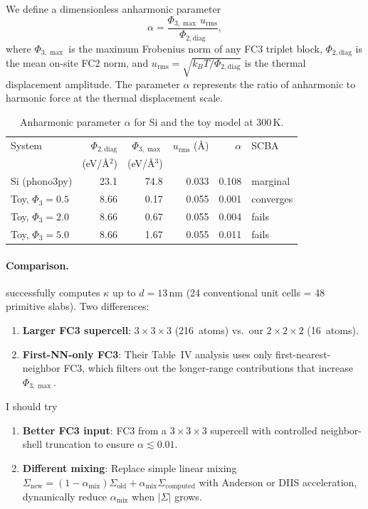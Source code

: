 We define a dimensionless anharmonic parameter
\begin{equation}\label{eq:alpha}
  \alpha = \frac{\Phi_{3,\max}\,u_\mathrm{rms}}{\Phi_{2,\mathrm{diag}}},
\end{equation}
where $\Phi_{3,\max}$ is the maximum Frobenius norm of any FC3 triplet
block, $\Phi_{2,\mathrm{diag}}$ is the mean on-site FC2 norm, and
$u_\mathrm{rms} = \sqrt{k_B T / \Phi_{2,\mathrm{diag}}}$ is the
thermal displacement amplitude.  The parameter $\alpha$ represents the
ratio of anharmonic to harmonic force at the thermal displacement
scale.

\begin{table}[h]
  \centering
  \caption{Anharmonic parameter $\alpha$ for Si and the toy model at
    300\,K.}
  \label{tab:alpha}
  \begin{tabular}{lrrrrl}
    \toprule
    System & $\Phi_{2,\mathrm{diag}}$ & $\Phi_{3,\max}$
      & $u_\mathrm{rms}$ (\AA) & $\alpha$ & SCBA \\
    & (eV/\AA$^2$) & (eV/\AA$^3$) & & & \\
    \midrule
    Si (phono3py) & 23.1 & 74.8 & 0.033 & 0.108 & marginal \\
    Toy, $\Phi_3 = 0.5$ & 8.66 & 0.17 & 0.055 & 0.001 & converges \\
    Toy, $\Phi_3 = 2.0$ & 8.66 & 0.67 & 0.055 & 0.004 & fails \\
    Toy, $\Phi_3 = 5.0$ & 8.66 & 1.67 & 0.055 & 0.011 & fails \\
    \bottomrule
  \end{tabular}
\end{table}

\paragraph{Comparison.}
\cite{guo_quantum_2020} successfully computes
$\kappa$ up to $d = 13$\,nm (24 conventional unit cells = 48 primitive
slabs). Two differences:
\begin{enumerate}
  \item \textbf{Larger FC3 supercell}: $3\times 3\times 3$ (216~atoms)
    vs.\ our $2\times 2\times 2$ (16~atoms).
  \item \textbf{First-NN-only FC3}: Their Table~IV analysis uses only
    first-nearest-neighbor FC3, which filters out the
    longer-range contributions that increase $\Phi_{3,\max}$.
\end{enumerate}
I should try
\begin{enumerate}
  \item \textbf{Better FC3 input}: FC3 from a $3\times 3\times 3$
    supercell with controlled neighbor-shell truncation to ensure
    $\alpha \lesssim 0.01$.
  \item \textbf{Different mixing}: Replace simple linear mixing
    $\Sigma_\mathrm{new} = (1-\alpha_\mathrm{mix})\Sigma_\mathrm{old}
    + \alpha_\mathrm{mix}\Sigma_\mathrm{computed}$ with Anderson or
    DIIS acceleration, dynamically reduce
    $\alpha_\mathrm{mix}$ when $|\Sigma|$ grows.
\end{enumerate}

